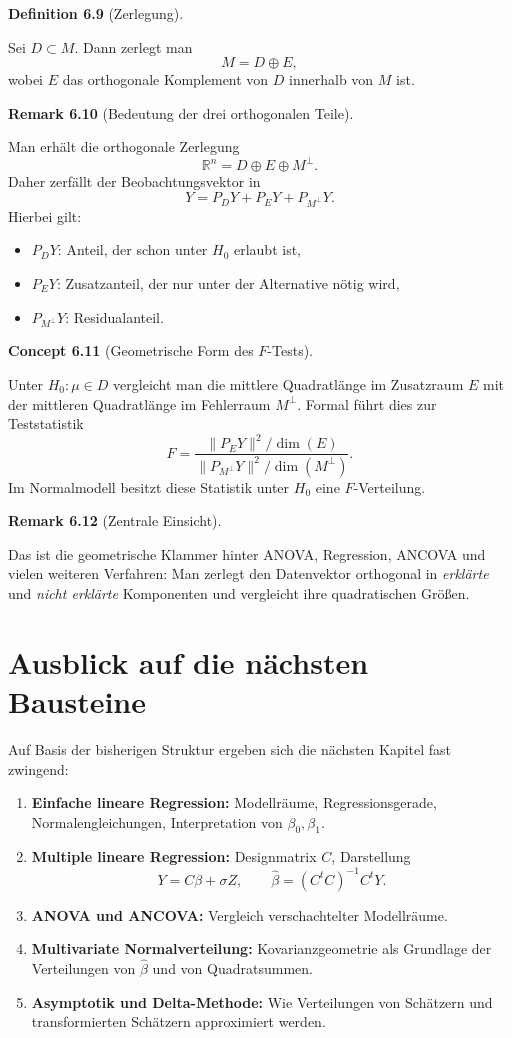 \documentclass[10pt, letterpaper]{article}
\newcommand{\R}{\mathbb{R}}
\newcommand{\CustomHeading}[3]{%
  \par\medskip\noindent%
  \textbf{#1 #2} \textnormal{(#3)}.\enskip%
}
\newenvironment{DEF}[2]{\CustomHeading{Definition}{#1}{#2}}{}
\newenvironment{REM}[2]{\CustomHeading{Remark}{#1}{#2}}{}
\newenvironment{CONC}[2]{\CustomHeading{Concept}{#1}{#2}}{}
\begin{document}
\begin{DEF}{6.9}{Zerlegung}
Sei \(D\subset M\). Dann zerlegt man
\[
M=D\oplus E,
\]
wobei \(E\) das orthogonale Komplement von \(D\) innerhalb von \(M\) ist.
\end{DEF}

\begin{REM}{6.10}{Bedeutung der drei orthogonalen Teile}
Man erhält die orthogonale Zerlegung
\[
\R^n = D \oplus E \oplus M^\perp.
\]
Daher zerfällt der Beobachtungsvektor in
\[
Y=P_DY + P_EY + P_{M^\perp}Y.
\]
Hierbei gilt:
\begin{itemize}
    \item \(P_DY\): Anteil, der schon unter \(H_0\) erlaubt ist,
    \item \(P_EY\): Zusatzanteil, der nur unter der Alternative nötig wird,
    \item \(P_{M^\perp}Y\): Residualanteil.
\end{itemize}
\end{REM}

\begin{CONC}{6.11}{Geometrische Form des \(F\)-Tests}
Unter \(H_0:\mu\in D\) vergleicht man die mittlere Quadratlänge im Zusatzraum \(E\) mit der mittleren Quadratlänge im Fehlerraum \(M^\perp\). Formal führt dies zur Teststatistik
\[
F
=
\frac{\|P_EY\|^2/\dim(E)}{\|P_{M^\perp}Y\|^2/\dim(M^\perp)}.
\]
Im Normalmodell besitzt diese Statistik unter \(H_0\) eine \(F\)-Verteilung.
\end{CONC}

\begin{REM}{6.12}{Zentrale Einsicht}
Das ist die geometrische Klammer hinter ANOVA, Regression, ANCOVA und vielen weiteren Verfahren: Man zerlegt den Datenvektor orthogonal in \emph{erklärte} und \emph{nicht erklärte} Komponenten und vergleicht ihre quadratischen Größen.
\end{REM}

\section{Ausblick auf die nächsten Bausteine}

Auf Basis der bisherigen Struktur ergeben sich die nächsten Kapitel fast zwingend:

\begin{enumerate}
    \item \textbf{Einfache lineare Regression:}
    Modellräume, Regressionsgerade, Normalengleichungen, Interpretation von \(\beta_0,\beta_1\).
    \item \textbf{Multiple lineare Regression:}
    Designmatrix \(C\), Darstellung
    \[
    Y=C\beta+\sigma Z,
    \qquad
    \hat\beta=(C^tC)^{-1}C^tY.
    \]
    \item \textbf{ANOVA und ANCOVA:}
    Vergleich verschachtelter Modellräume.
    \item \textbf{Multivariate Normalverteilung:}
    Kovarianzgeometrie als Grundlage der Verteilungen von \(\hat\beta\) und von Quadratsummen.
    \item \textbf{Asymptotik und Delta-Methode:}
    Wie Verteilungen von Schätzern und transformierten Schätzern approximiert werden.
\end{enumerate}
\end{document}
